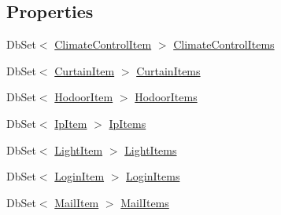 \subsection*{Properties}
\begin{DoxyCompactItemize}
\item 
Db\+Set$<$ \mbox{\hyperlink{class_f_w_p_s_1_1_models_1_1_climate_control_item}{Climate\+Control\+Item}} $>$ \mbox{\hyperlink{class_f_w_p_s_1_1_data_1_1_fwps_db_context_aa1747c42762bf975c7eb27530b471f15}{Climate\+Control\+Items}}
\item 
Db\+Set$<$ \mbox{\hyperlink{class_f_w_p_s_1_1_models_1_1_curtain_item}{Curtain\+Item}} $>$ \mbox{\hyperlink{class_f_w_p_s_1_1_data_1_1_fwps_db_context_a3e96b8418082acb4a1426194ddb25c13}{Curtain\+Items}}
\item 
Db\+Set$<$ \mbox{\hyperlink{class_f_w_p_s_1_1_models_1_1_hodoor_item}{Hodoor\+Item}} $>$ \mbox{\hyperlink{class_f_w_p_s_1_1_data_1_1_fwps_db_context_a16d4440bf05e41fa163a95b1954a40c7}{Hodoor\+Items}}
\item 
Db\+Set$<$ \mbox{\hyperlink{class_f_w_p_s_1_1_models_1_1_ip_item}{Ip\+Item}} $>$ \mbox{\hyperlink{class_f_w_p_s_1_1_data_1_1_fwps_db_context_a8416529ef3271813925283d9477c0e7d}{Ip\+Items}}
\item 
Db\+Set$<$ \mbox{\hyperlink{class_f_w_p_s_1_1_models_1_1_light_item}{Light\+Item}} $>$ \mbox{\hyperlink{class_f_w_p_s_1_1_data_1_1_fwps_db_context_a9fc66d579ee503024f0c50a33731347e}{Light\+Items}}
\item 
Db\+Set$<$ \mbox{\hyperlink{class_f_w_p_s_1_1_models_1_1_login_item}{Login\+Item}} $>$ \mbox{\hyperlink{class_f_w_p_s_1_1_data_1_1_fwps_db_context_a022fb6737906ce4558ed8193b4435a73}{Login\+Items}}
\item 
Db\+Set$<$ \mbox{\hyperlink{class_f_w_p_s_1_1_models_1_1_mail_item}{Mail\+Item}} $>$ \mbox{\hyperlink{class_f_w_p_s_1_1_data_1_1_fwps_db_context_a820626efe785fe95e50e7ace63ceede2}{Mail\+Items}}

\end{DoxyCompactItemize}
